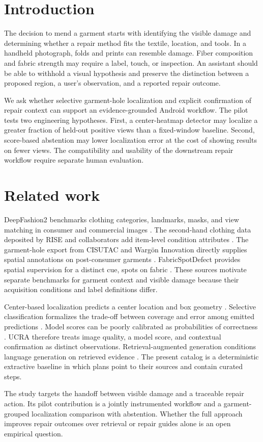\section{Introduction}

The decision to mend a garment starts with identifying the visible damage and determining whether a repair method fits the textile, location, and tools. In a handheld photograph, folds and prints can resemble damage. Fiber composition and fabric strength may require a label, touch, or inspection. An assistant should be able to withhold a visual hypothesis and preserve the distinction between a proposed region, a user's observation, and a reported repair outcome.

We ask whether selective garment-hole localization and explicit confirmation of repair context can support an evidence-grounded Android workflow. The pilot tests two engineering hypotheses. First, a center-heatmap detector may localize a greater fraction of held-out positive views than a fixed-window baseline. Second, score-based abstention may lower localization error at the cost of showing results on fewer views. The compatibility and usability of the downstream repair workflow require separate human evaluation.

\section{Related work}

DeepFashion2 benchmarks clothing categories, landmarks, masks, and view matching in consumer and commercial images \cite{ge2019}. The second-hand clothing data deposited by RISE and collaborators add item-level condition attributes \cite{nauman}. The garment-hole export from CISUTAC and Warg\"on Innovation directly supplies spatial annotations on post-consumer garments \cite{cisutac}. FabricSpotDefect provides spatial supervision for a distinct cue, spots on fabric \cite{fabricspot}. These sources motivate separate benchmarks for garment context and visible damage because their acquisition conditions and label definitions differ.

Center-based localization predicts a center location and box geometry \cite{zhou2019}. Selective classification formalizes the trade-off between coverage and error among emitted predictions \cite{geifman2017}. Model scores can be poorly calibrated as probabilities of correctness \cite{guo2017}. UCRA therefore treats image quality, a model score, and contextual confirmation as distinct observations. Retrieval-augmented generation conditions language generation on retrieved evidence \cite{lewis2020}. The present catalog is a deterministic extractive baseline in which plans point to their sources and contain curated steps.

The study targets the handoff between visible damage and a traceable repair action. Its pilot contribution is a jointly instrumented workflow and a garment-grouped localization comparison with abstention. Whether the full approach improves repair outcomes over retrieval or repair guides alone is an open empirical question.
